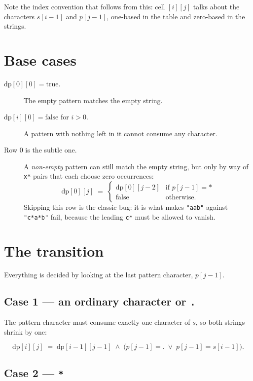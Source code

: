 \documentclass[11pt,a4paper]{article}
\begin{document}
Note the index convention that follows from this: cell $[i][j]$ talks about the characters
$s[i-1]$ and $p[j-1]$, one-based in the table and zero-based in the strings.

\section{Base cases}

\begin{description}
  \item[{$\mathrm{dp}[0][0] = \text{true}$.}] The empty pattern matches the empty string.
  \item[{$\mathrm{dp}[i][0] = \text{false}$ for $i > 0$.}] A pattern with nothing left in it cannot
        consume any character.
  \item[{Row $0$ is the subtle one.}] A \emph{non-empty} pattern can still match the empty string,
        but only by way of \texttt{x*} pairs that each choose zero occurrences:
        \[
          \mathrm{dp}[0][j] \;=\;
          \begin{cases}
            \mathrm{dp}[0][j-2] & \text{if } p[j-1] = \texttt{*}\\[2pt]
            \text{false}        & \text{otherwise.}
          \end{cases}
        \]
        Skipping this row is the classic bug: it is what makes \texttt{"aab"} against
        \texttt{"c*a*b"} fail, because the leading \texttt{c*} must be allowed to vanish.
\end{description}

\section{The transition}

Everything is decided by looking at the last pattern character, $p[j-1]$.

\subsection*{Case 1 --- an ordinary character or \texttt{.}}

The pattern character must consume exactly one character of $s$, so both strings shrink by one:

\[
  \mathrm{dp}[i][j] \;=\; \mathrm{dp}[i-1][j-1] \;\wedge\;
  \bigl(p[j-1] = \texttt{.} \;\vee\; p[j-1] = s[i-1]\bigr).
\]

\subsection*{Case 2 --- \texttt{*}}
\end{document}
